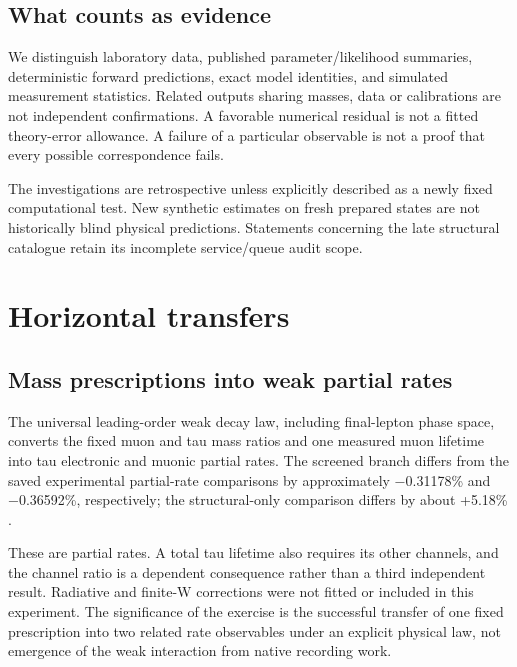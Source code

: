 \documentclass[11pt,a4paper]{article}
\begin{document}
\subsection{What counts as evidence}\label{what-counts-as-evidence}

We distinguish laboratory data, published parameter/likelihood summaries, deterministic forward predictions, exact model identities, and simulated measurement statistics. Related outputs sharing masses, data or calibrations are not independent confirmations. A favorable numerical residual is not a fitted theory-error allowance. A failure of a particular observable is not a proof that every possible correspondence fails.

The investigations are retrospective unless explicitly described as a newly fixed computational test. New synthetic estimates on fresh prepared states are not historically blind physical predictions. Statements concerning the late structural catalogue retain its incomplete service/queue audit scope.

\section{Horizontal transfers}\label{horizontal-transfers}

\subsection{Mass prescriptions into weak partial rates}\label{mass-prescriptions-into-weak-partial-rates}

The universal leading-order weak decay law, including final-lepton phase space, converts the fixed muon and tau mass ratios and one measured muon lifetime into tau electronic and muonic partial rates. The screened branch differs from the saved experimental partial-rate comparisons by approximately −0.31178\% and −0.36592\%, respectively; the structural-only comparison differs by about +5.18\% \cite{R17}.

These are partial rates. A total tau lifetime also requires its other channels, and the channel ratio is a dependent consequence rather than a third independent result. Radiative and finite-W corrections were not fitted or included in this experiment. The significance of the exercise is the successful transfer of one fixed prescription into two related rate observables under an explicit physical law, not emergence of the weak interaction from native recording work.
\end{document}
